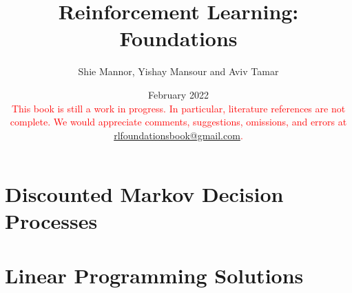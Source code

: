 \documentclass[12pt]{book}
\title{Reinforcement Learning: Foundations}
\date{February 2022
\\
  \textcolor{red}{This book is still a work in progress. In particular, literature references are not complete. We would appreciate comments, suggestions, omissions, and errors at \url{rlfoundationsbook@gmail.com}. }
}
\author{Shie Mannor, Yishay Mansour and Aviv Tamar}
\begin{document}
\maketitle

\tableofcontents

% 

% 

% 

% 

\chapter{Discounted Markov Decision Processes}
\label{chapter:disc}


\chapter{Linear Programming Solutions}\label{chapter-LP}


% 

% 
% 
\end{document}
